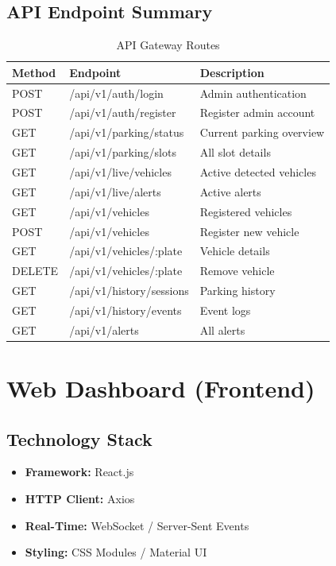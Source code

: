 \documentclass[12pt,a4paper]{report}
\begin{document}
\subsection{API Endpoint Summary}
\begin{table}[H]
\centering
\caption{API Gateway Routes}
\begin{tabular}{|l|l|l|}
\hline
\textbf{Method} & \textbf{Endpoint} & \textbf{Description} \\
\hline
POST & /api/v1/auth/login & Admin authentication \\
\hline
POST & /api/v1/auth/register & Register admin account \\
\hline
GET & /api/v1/parking/status & Current parking overview \\
\hline
GET & /api/v1/parking/slots & All slot details \\
\hline
GET & /api/v1/live/vehicles & Active detected vehicles \\
\hline
GET & /api/v1/live/alerts & Active alerts \\
\hline
GET & /api/v1/vehicles & Registered vehicles \\
\hline
POST & /api/v1/vehicles & Register new vehicle \\
\hline
GET & /api/v1/vehicles/:plate & Vehicle details \\
\hline
DELETE & /api/v1/vehicles/:plate & Remove vehicle \\
\hline
GET & /api/v1/history/sessions & Parking history \\
\hline
GET & /api/v1/history/events & Event logs \\
\hline
GET & /api/v1/alerts & All alerts \\
\hline
\end{tabular}
\end{table}


\section{Web Dashboard (Frontend)}

\subsection{Technology Stack}
\begin{itemize}
    \item \textbf{Framework:} React.js
    \item \textbf{HTTP Client:} Axios
    \item \textbf{Real-Time:} WebSocket / Server-Sent Events
    \item \textbf{Styling:} CSS Modules / Material UI
\end{itemize}
\end{document}
